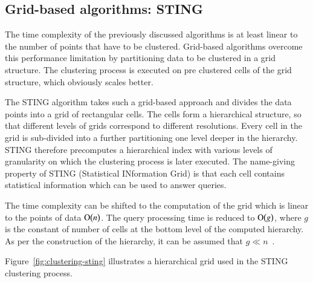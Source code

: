 \subsection{Grid-based algorithms: STING}

The time complexity of the previously discussed algorithms is at least linear to the number of points that have to be clustered. Grid-based algorithms overcome this performance limitation by partitioning data to be clustered in a grid structure. The clustering process is executed on pre clustered cells of the grid structure, which obviously scales better.

The STING algorithm takes such a grid-based approach and divides the data points into a grid of rectangular cells. The cells form a hierarchical structure, so that different levels of grids correspond to different resolutions. Every cell in the grid is sub-divided into a further partitioning one level deeper in the hierarchy. STING therefore precomputes a hierarchical index with various levels of granularity on which the clustering process is later executed. The name-giving property of STING (Statistical INformation Grid) is that each cell contains statistical information which can be used to answer queries. 

The time complexity can be shifted to the computation of the grid which is linear to the points of data $\operatorname{O}\bigl(n\bigr)$. The query processing time is reduced to $\operatorname{O}\bigl(g\bigr)$, where $g$ is the constant of number of cells at the bottom level of the computed hierarchy. As per the construction of the hierarchy, it can be assumed that $g \ll n$~\cite{Varlaro08spatial, Wang97sting}.  

Figure~\ref{fig:clustering-sting} illustrates a hierarchical grid used in the STING clustering process.

